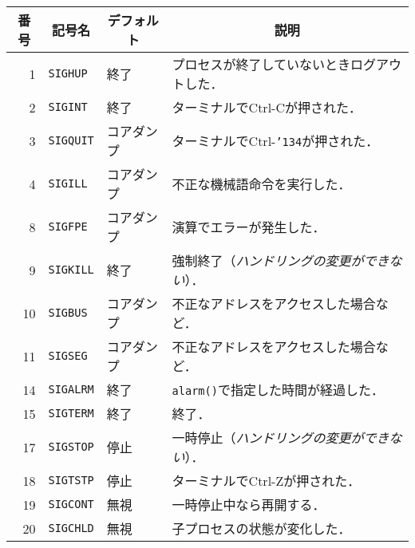 \documentclass[border=1mm]{standalone}
\newcommand{\bs}{\texttt{\char'134}}  %
\def\|{\verb|} %|
\begin{document}
\begin{tabular}{r | l | l | l}\hline\hline
\multicolumn{1}{c|}{番号} &
\multicolumn{1}{c|}{記号名} &
\multicolumn{1}{c|}{デフォルト} &
\multicolumn{1}{c}{説明} \\\hline
1  & \|SIGHUP|  & 終了       & プロセスが終了していないときログアウトした． \\
2  & \|SIGINT|  & 終了       & ターミナルでCtrl-Cが押された． \\
3  & \|SIGQUIT| & コアダンプ & ターミナルでCtrl-{\bs}が押された． \\
4  & \|SIGILL|  & コアダンプ & 不正な機械語命令を実行した． \\
8  & \|SIGFPE|  & コアダンプ & 演算でエラーが発生した． \\
9  & \|SIGKILL| & 終了   & 強制終了（\emph{ハンドリングの変更ができない}）． \\
10 & \|SIGBUS|  & コアダンプ & 不正なアドレスをアクセスした場合など．\\
11 & \|SIGSEG|  & コアダンプ & 不正なアドレスをアクセスした場合など．\\
14 & \|SIGALRM| & 終了       & \|alarm()|で指定した時間が経過した． \\
15 & \|SIGTERM| & 終了       & 終了． \\
17 & \|SIGSTOP| & 停止   & 一時停止（\emph{ハンドリングの変更ができない}）． \\
18 & \|SIGTSTP| & 停止       & ターミナルでCtrl-Zが押された． \\
19 & \|SIGCONT| & 無視       & 一時停止中なら再開する． \\
20 & \|SIGCHLD| & 無視       & 子プロセスの状態が変化した． \\
\end{tabular}
\end{document}
